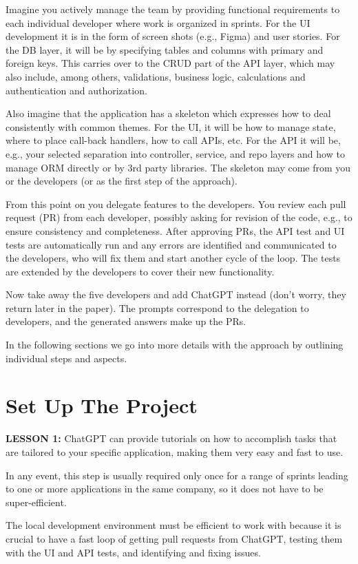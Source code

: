 \documentclass[runningheads]{llncs}
\begin{document}
Imagine you actively manage the team by providing functional requirements to each individual developer where work is organized in sprints. For the UI development it is in the form of screen shots (e.g., Figma) and user stories. For the DB layer, it will be by specifying tables and columns with primary and foreign keys. This carries over to the CRUD part of the API layer, which may also include, among others, validations, business logic, calculations and authentication and authorization.

Also imagine that the application has a skeleton which expresses how to deal consistently with common themes. For the UI, it will be how to manage state, where to place call-back handlers, how to call APIs, etc. For the API it will be, e.g., your selected separation into controller, service, and repo layers and how to manage ORM directly or by 3rd party libraries. The skeleton may come from you or the developers (or as the first step of the approach).

From this point on you delegate features to the developers. You review each pull request (PR) from each developer, possibly asking for revision of the code, e.g., to ensure consistency and completeness. After approving PRs, the API test and UI tests are automatically run and any errors are identified and communicated to the developers, who will fix them and start another cycle of the loop. The tests are extended by the developers to cover their new functionality.

Now take away the five developers and add ChatGPT instead (don't worry, they return later in the paper). The prompts correspond to the delegation to developers, and the generated answers make up the PRs.

In the following sections we go into more details with the approach by outlining individual steps and aspects.

\section{Set Up The Project}
\textbf{LESSON 1:} ChatGPT can provide tutorials on how to accomplish tasks that are tailored to your specific application, making them very easy and fast to use.

In any event, this step is usually required only once for a range of sprints leading to one or more applications in the same company, so it does not have to be super-efficient.

The local development environment must be efficient to work with because it is crucial to have a fast loop of getting pull requests from ChatGPT, testing them with the UI and API tests, and identifying and fixing issues.
\end{document}
